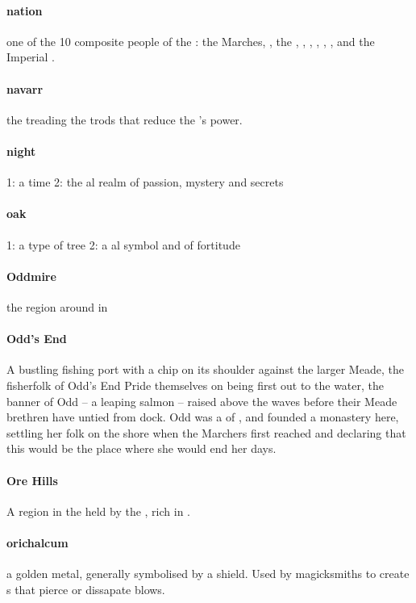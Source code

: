 \paragraph{nation} one of the 10 composite people of the : the Marches, , the , , , , , ,  and the Im\-pe\-ri\-al .
\paragraph{navarr} the  treading the trods that reduce the 's power.
\paragraph{night} 1: a time 2: the al realm of passion, mystery and secrets
\paragraph{oak} 1: a type of tree 2: a al symbol and  of fortitude
\paragraph{Oddmire} the region around  in 
\paragraph{Odd's End} A bustling fishing port with a chip on its shoulder against the larger Meade, the fisherfolk of Odd's End Pride themselves on being first out to the water, the banner of Odd – a leaping salmon – raised above the waves before their Meade brethren have untied from dock. Odd was a  of , and founded a monastery here, settling her folk on the shore when the Marchers first reached  and declaring that this would be the place where she would end her days. 
\paragraph{Ore Hills} A region in the  held by the , rich in .
\paragraph{orichalcum} a golden metal, generally symbolised by a shield. Used by magicksmiths to create s that pierce or dissapate blows.
